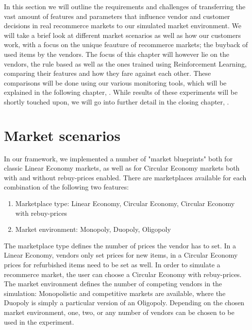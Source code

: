 \begin{jointwork}
	In this section we will outline the requirements and challenges of transferring the vast amount of features and parameters that influence vendor and customer decisions in real recommerce markets to our simulated market environment. We will take a brief look at different market scenarios as well as how our customers work, with a focus on the unique feauture of recommerce markets; the buyback of used items by the vendors. The focus of this chapter will however lie on the vendors, the rule based as well as the ones trained using Reinforcement Learning, comparing their features and how they fare against each other. These comparisons will be done using our various monitoring tools, which will be explained in the following chapter, . While results of these experiments will be shortly touched upon, we will go into further detail in the closing chapter, .
\end{jointwork}

\section{Market scenarios} \label{sec:MarketScenarios}

In our framework, we implemented a number of "market blueprints" both for classic Linear Economy markets, as well as for Circular Economy markets both with and without rebuy-prices enabled. There are marketplaces available for each combination of the following two features:
\begin{enumerate}
	\item Marketplace type: Linear Economy, Circular Economy, Circular Economy with rebuy-prices
	\item Market environment: Monopoly, Duopoly, Oligopoly
\end{enumerate}
The marketplace type defines the number of prices the vendor has to set. In a Linear Economy, vendors only set prices for new items, in a Circular Economy prices for refurbished items need to be set as well. In order to simulate a recommerce market, the user can choose a Circular Economy with rebuy-prices.
The market environment defines the number of competing vendors in the simulation: Monopolistic and competitive markets are available, where the Duopoly is simply a particular version of an Oligopoly. Depending on the chosen market environment, one, two, or any number of vendors can be chosen to be used in the experiment.

